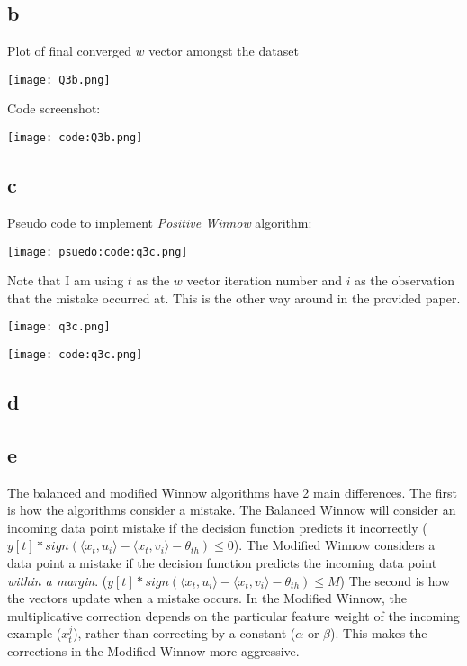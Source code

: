 \documentclass{article}
\begin{document}
\subsection*{b}

Plot of final converged \(w\) vector amongst the dataset

\texttt{[image: Q3b.png]}

Code screenshot: 

\texttt{[image: code:Q3b.png]}

\newpage
\subsection*{c}

Pseudo code to implement \emph{Positive Winnow} algorithm:

\texttt{[image: psuedo:code:q3c.png]}

Note that I am using \(t\) as the \(w\) vector iteration number and \(i\) as the observation that the mistake
occurred at. This is the other way around in the provided paper.

\texttt{[image: q3c.png]}

\texttt{[image: code:q3c.png]}

\newpage
\subsection*{d}

\subsection*{e}

The balanced and modified Winnow algorithms have 2 main differences. The first is
how the algorithms consider a mistake. The Balanced Winnow will consider an incoming 
data point mistake if the decision function predicts it incorrectly 
(\(y[t] * sign(\langle x_{t}, u_{i} \rangle - \langle x_{t}, v_{i} \rangle - \theta_{th}) \leq 0\)).
The Modified Winnow considers a data point a mistake if the decision function predicts
the incoming data point \emph{within a margin}. 
(\(y[t] * sign(\langle x_{t}, u_{i} \rangle - \langle x_{t}, v_{i} \rangle - \theta_{th}) \leq M\))
The second is how the vectors update when a mistake occurs. In the Modified Winnow, the multiplicative correction 
depends on the particular feature weight of the incoming example (\(x_{t}^{j}\)), rather than 
correcting by a constant (\(\alpha\) or \(\beta\)). This makes the corrections
in the Modified Winnow more aggressive.
\end{document}
